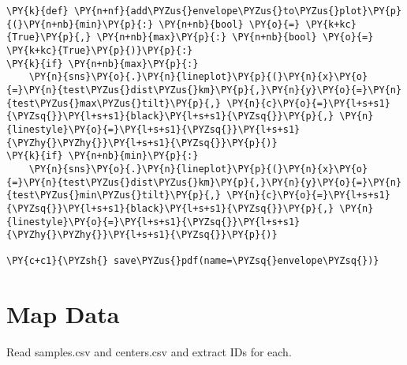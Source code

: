 \begin{tcolorbox}[breakable, size=fbox, boxrule=1pt, pad at break*=1mm,colback=cellbackground, colframe=cellborder]
\begin{Verbatim}[commandchars=\\\{\}]
\PY{k}{def} \PY{n+nf}{add\PYZus{}envelope\PYZus{}to\PYZus{}plot}\PY{p}{(}\PY{n+nb}{min}\PY{p}{:} \PY{n+nb}{bool} \PY{o}{=} \PY{k+kc}{True}\PY{p}{,} \PY{n+nb}{max}\PY{p}{:} \PY{n+nb}{bool} \PY{o}{=} \PY{k+kc}{True}\PY{p}{)}\PY{p}{:}
\PY{k}{if} \PY{n+nb}{max}\PY{p}{:}
    \PY{n}{sns}\PY{o}{.}\PY{n}{lineplot}\PY{p}{(}\PY{n}{x}\PY{o}{=}\PY{n}{test\PYZus{}dist\PYZus{}km}\PY{p}{,}\PY{n}{y}\PY{o}{=}\PY{n}{test\PYZus{}max\PYZus{}tilt}\PY{p}{,} \PY{n}{c}\PY{o}{=}\PY{l+s+s1}{\PYZsq{}}\PY{l+s+s1}{black}\PY{l+s+s1}{\PYZsq{}}\PY{p}{,} \PY{n}{linestyle}\PY{o}{=}\PY{l+s+s1}{\PYZsq{}}\PY{l+s+s1}{\PYZhy{}\PYZhy{}}\PY{l+s+s1}{\PYZsq{}}\PY{p}{)}
\PY{k}{if} \PY{n+nb}{min}\PY{p}{:}
    \PY{n}{sns}\PY{o}{.}\PY{n}{lineplot}\PY{p}{(}\PY{n}{x}\PY{o}{=}\PY{n}{test\PYZus{}dist\PYZus{}km}\PY{p}{,}\PY{n}{y}\PY{o}{=}\PY{n}{test\PYZus{}min\PYZus{}tilt}\PY{p}{,} \PY{n}{c}\PY{o}{=}\PY{l+s+s1}{\PYZsq{}}\PY{l+s+s1}{black}\PY{l+s+s1}{\PYZsq{}}\PY{p}{,} \PY{n}{linestyle}\PY{o}{=}\PY{l+s+s1}{\PYZsq{}}\PY{l+s+s1}{\PYZhy{}\PYZhy{}}\PY{l+s+s1}{\PYZsq{}}\PY{p}{)}

\PY{c+c1}{\PYZsh{} save\PYZus{}pdf(name=\PYZsq{}envelope\PYZsq{})}
\end{Verbatim}
\end{tcolorbox}

\hypertarget{map-data}{%
\section{Map Data}\label{map-data}}

Read samples.csv and centers.csv and extract IDs for each.

